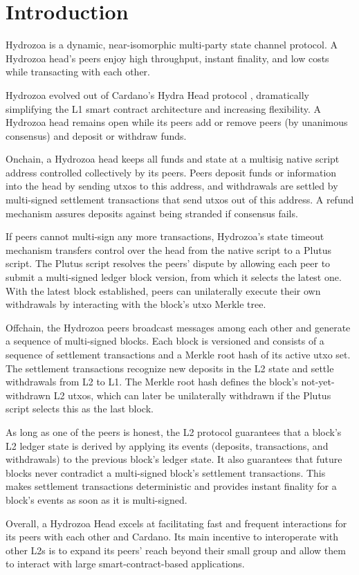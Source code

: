 \documentclass[../hydrozoa.tex]{subfiles}
\begin{document}
\section*{Introduction}%
\label{h:introduction}


Hydrozoa is a dynamic, near-isomorphic multi-party state channel protocol.
A Hydrozoa head's peers enjoy high throughput, instant finality, and low costs while transacting with each other.

Hydrozoa evolved out of Cardano's Hydra Head protocol \citep{NagelEtAlHydraHeadV1Specification2024}, dramatically simplifying the L1 smart contract architecture and increasing flexibility.
A Hydrozoa head remains open while its peers add or remove peers (by unanimous consensus) and deposit or withdraw funds.

Onchain, a Hydrozoa head keeps all funds and state at a multisig native script address controlled collectively by its peers.
Peers deposit funds or information into the head by sending utxos to this address,
and withdrawals are settled by multi-signed settlement transactions that send utxos out of this address.
A refund mechanism assures deposits against being stranded if consensus fails.

If peers cannot multi-sign any more transactions, Hydrozoa's state timeout mechanism transfers control over the head from the native script to a Plutus script.
The Plutus script resolves the peers' dispute by allowing each peer to submit a multi-signed ledger block version, from which it selects the latest one.
With the latest block established, peers can unilaterally execute their own withdrawals by interacting with the block's utxo Merkle tree.

Offchain, the Hydrozoa peers broadcast messages among each other and generate a sequence of multi-signed blocks.
Each block is versioned and consists of a sequence of settlement transactions and a Merkle root hash of its active utxo set.
The settlement transactions recognize new deposits in the L2 state and settle withdrawals from L2 to L1.
The Merkle root hash defines the block's not-yet-withdrawn L2 utxos, which can later be unilaterally withdrawn if the Plutus script selects this as the last block.

As long as one of the peers is honest, the L2 protocol guarantees that a block's L2 ledger state is derived by applying its events (deposits, transactions, and withdrawals) to the previous block's ledger state.
It also guarantees that future blocks never contradict a multi-signed block's settlement transactions.
This makes settlement transactions deterministic and provides instant finality for a block's events as soon as it is multi-signed.

Overall, a Hydrozoa Head excels at facilitating fast and frequent interactions for its peers with each other and Cardano.
Its main incentive to interoperate with other L2s is to expand its peers' reach beyond their small group and allow them to interact with large smart-contract-based applications.

\end{document}
